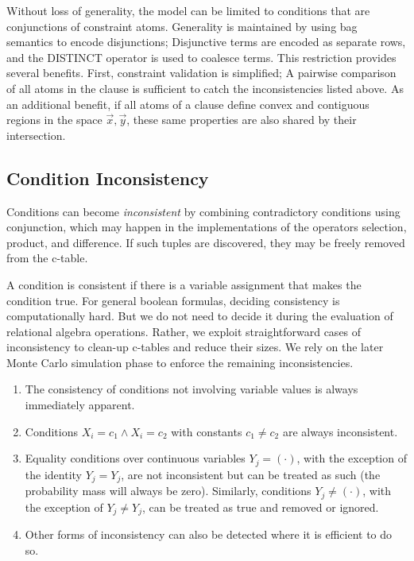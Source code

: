 Without loss of generality, the model can be limited to conditions that are conjunctions of constraint  atoms.  Generality  is maintained by  using bag semantics to encode disjunctions; Disjunctive terms are encoded as separate rows, and the DISTINCT operator is used to coalesce terms.  This  restriction   provides   several  benefits. First, constraint  validation is  simplified;  A pairwise  comparison of  all atoms in the clause is  sufficient to catch the inconsistencies listed above.   As an additional  benefit, if  all atoms  of a  clause define convex and  contiguous regions in the space $\vec{x},\vec{y}$, these same properties are also shared by their intersection.

\subsection{Condition Inconsistency}
Conditions can become \textit{inconsistent} by combining contradictory conditions using conjunction, which may happen in the implementations of the operators selection, product, and difference.  If such tuples are discovered, they may be freely removed from the c-table.  

A condition is consistent if there is a variable assignment that makes the condition true. For general boolean formulas, deciding consistency is computationally hard. But we do not need to decide it during the evaluation of relational algebra operations.  Rather, we exploit straightforward cases of inconsistency to clean-up c-tables and reduce their sizes. We rely on the later Monte Carlo simulation phase to enforce the remaining inconsistencies.
%
\begin{enumerate}
\item The consistency of conditions not involving variable values is always immediately apparent.
\item Conditions $X_i = c_1 \land X_i = c_2$ with constants $c_1 \neq c_2$ are always inconsistent.
\item Equality conditions over continuous variables $Y_j = (\cdot)$, with the exception of the identity $Y_j = Y_j$, are not inconsistent but can be treated as such (the probability mass will always be zero).  Similarly, conditions $Y_j \neq (\cdot)$, with the exception of $Y_j \neq Y_j$, can be treated as true and removed or ignored.
\item Other forms of inconsistency can also be detected where it is efficient to do so.
\end{enumerate}

